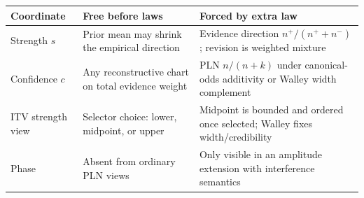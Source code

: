 \documentclass[11pt,openany]{report}
\begin{document}
\begin{center}
\renewcommand{\arraystretch}{1.18}
\begin{tabular}{@{}p{}p{}p{}@{}}
\toprule
\textbf{Coordinate} & \textbf{Free before laws} & \textbf{Forced by extra law} \\
\midrule
Strength $s$ &
Prior mean may shrink the empirical direction &
Evidence direction $n^+/(n^++n^-)$; revision is weighted mixture \\
Confidence $c$ &
Any reconstructive chart on total evidence weight &
PLN $n/(n+k)$ under canonical-odds additivity or Walley width complement \\
ITV strength view &
Selector choice: lower, midpoint, or upper &
Midpoint is bounded and ordered once selected; Walley fixes width/credibility \\
Phase &
Absent from ordinary PLN views &
Only visible in an amplitude extension with interference semantics \\
\bottomrule
\end{tabular}
\end{center}
\end{document}
